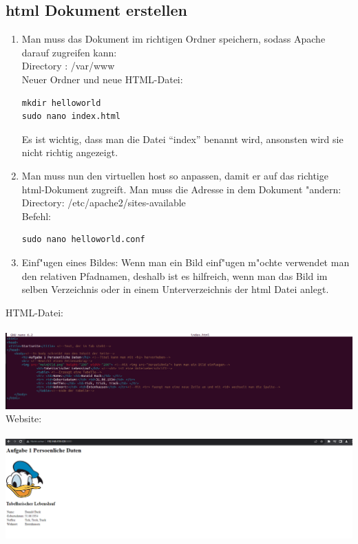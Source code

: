 \documentclass[a4paper,11pt,titlepage]{article}
\begin{document}
\subsection{html Dokument erstellen}
\begin{enumerate}
\item Man muss das Dokument im richtigen Ordner speichern, sodass Apache darauf zugreifen kann:\\
Directory : /var/www\\
Neuer Ordner und neue HTML-Datei: 
\begin{verbatim}
mkdir helloworld
sudo nano index.html
\end{verbatim}
Es ist wichtig, dass man die Datei "`index"' benannt wird, ansonsten wird sie nicht richtig angezeigt.
\item Man muss nun den virtuellen host so anpassen, damit er auf das richtige html-Dokument zugreift. Man muss die Adresse in dem Dokument "andern:\\
Directory: /etc/apache2/sites-available\\
Befehl: 
\begin{verbatim}sudo nano helloworld.conf\end{verbatim}
\item Einf"ugen eines Bildes: Wenn man ein Bild einf"ugen m"ochte verwendet man den relativen Pfadnamen, deshalb ist es hilfreich, wenn man das Bild im selben Verzeichnis oder in einem Unterverzeichnis der html Datei anlegt.
\end{enumerate}
HTML-Datei:\\
\\
\includegraphics [width = 15 cm] {HTML1.png}
\newpage 
\noindent Website:\\
\\
\includegraphics [width = 15 cm] {Website-Aufgabe1.png}\\
\end{document}
